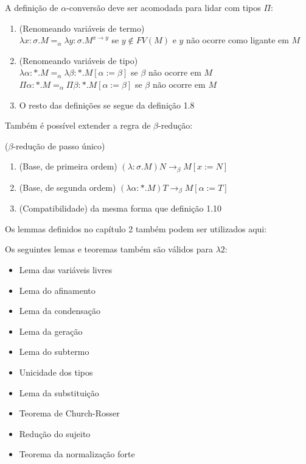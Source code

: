 \documentclass[../main.tex]{subfiles}
\begin{document}
A definição de $\alpha$-conversão deve ser acomodada para lidar com tipos $\Pi$:

\begin{definition}
    \hfil
    \begin{enumerate}
        \item (Renomeando variáveis de termo) \\ $\lambda x : \sigma . M =_{\alpha} \lambda y : \sigma . M^{x \to y}$ se $y \not\in FV(M)$ e $y$ não ocorre como ligante em $M$
        \item (Renomeando variáveis de tipo) \\ $\lambda \alpha : \ast . M =_{\alpha} \lambda \beta : \ast . M[\alpha := \beta]$ se $\beta$ não ocorre em $M$ \\
        $\Pi \alpha : \ast . M =_{\alpha} \Pi \beta : \ast . M[\alpha := \beta]$ se $\beta$ não ocorre em $M$
        \item O resto das definições se segue da definição 1.8
    \end{enumerate}
\end{definition}

Também é possível extender a regra de $\beta$-redução:

\begin{definition} ($\beta$-redução de passo único)
    \hfil
    \begin{enumerate}
        \item (Base, de primeira ordem) $(\lambda : \sigma . M)N \to_{\beta} M[x := N]$
        \item (Base, de segunda ordem) $(\lambda \alpha : \ast . M)T \to_{\beta} M[\alpha := T]$
        \item (Compatibilidade) da mesma forma que definição 1.10
    \end{enumerate}
\end{definition}

Os lemmas definidos no capítulo 2 também podem ser utilizados aqui:

\begin{lemma}
    Os seguintes lemas e teoremas também são válidos para $\lambda2$:
    \begin{itemize}
        \item Lema das variáveis livres
        \item Lema do afinamento
        \item Lema da condensação
        \item Lema da geração
        \item Lema do subtermo
        \item Unicidade dos tipos
        \item Lema da substituição
        \item Teorema de Church-Rosser
        \item Redução do sujeito
        \item Teorema da normalização forte
    \end{itemize}
\end{lemma}
\end{document}
